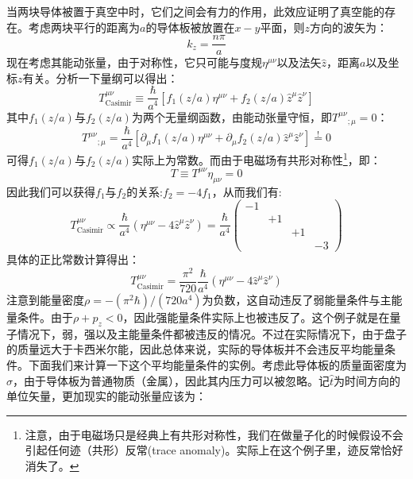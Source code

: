 \documentclass[hyperref, UTF8, a4paper]{ctexart}
\begin{document}
当两块导体被置于真空中时，它们之间会有力的作用，此效应证明了真空能的存在。考虑两块平行的距离为$a$的导体板被放置在$x-y$平面，则$z$方向的波矢为：
\begin{equation*}
	k_{z} =\frac{n\pi }{a}
\end{equation*}
现在考虑其能动张量，由于对称性，它只可能与度规$\eta ^{\mu \nu }$以及法矢$\hat{z}$，距离$a$以及坐标$z$有关。分析一下量纲可以得出：
\begin{equation*}
	T_{\text{Casimir}}^{\mu \nu } \equiv \frac{\hbar }{a^{4}}\left[ f_{1}( z/a) \eta ^{\mu \nu } +f_{2}( z/a)\hat{z}^{\mu }\hat{z}^{\nu }\right]
\end{equation*}
其中$f_{1}( z/a)$与$f_{2}( z/a)$为两个无量纲函数，由能动张量守恒，即$T^{\mu \nu }{}_{;\mu } =0$：
\begin{equation*}
	T^{\mu \nu }{}_{;\mu } =\frac{\hbar }{a^{4}}\left[ \partial _{\mu } f_{1}( z/a) \eta ^{\mu \nu } +\partial _{\mu } f_{2}( z/a)\hat{z}^{\mu }\hat{z}^{\nu }\right]\stackrel{!}{=} 0
\end{equation*}
可得$f_{1}( z/a)$与$f_{2}( z/a)$实际上为常数。而由于电磁场有共形对称性\footnote{注意，由于电磁场只是经典上有共形对称性，我们在做量子化的时候假设不会引起任何迹（共形）反常(trace anomaly)。实际上在这个例子里，迹反常恰好消失了。}，即：
\begin{equation*}
	T\equiv T^{\mu \nu } \eta _{\mu \nu } =0
\end{equation*}
因此我们可以获得$f_{1}$与$f_{2}$的关系:$f_{2} =-4f_{1}$，从而我们有:
\begin{equation*}
	T_{\text{Casimir}}^{\mu \nu } \varpropto \frac{\hbar }{a^{4}} (\eta ^{\mu \nu } -4\hat{z}^{\mu }\hat{z}^{\nu } )=\frac{\hbar }{a^{4}}\begin{pmatrix}
		-1 &  &  & \\
		& +1 &  & \\
		&  & +1 & \\
		&  &  & -3
	\end{pmatrix}
\end{equation*}
具体的正比常数计算得出：
\begin{equation*}
	T_{\text{Casimir}}^{\mu \nu } =\frac{\pi ^{2}}{720}\frac{\hbar }{a^{4}} (\eta ^{\mu \nu } -4\hat{z}^{\mu }\hat{z}^{\nu } )
\end{equation*}
注意到能量密度$\rho =-(\pi ^{2} \hbar )/(720a^{4} )$为负数，这自动违反了弱能量条件与主能量条件。由于$\rho +p_{z} < 0$，因此强能量条件实际上也被违反了。这个例子就是在量子情况下，弱，强以及主能量条件都被违反的情况。不过在实际情况下，由于盘子的质量远大于卡西米尔能，因此总体来说，实际的导体板并不会违反平均能量条件。下面我们来计算一下这个平均能量条件的实例。考虑此导体板的质量面密度为$\sigma $，由于导体板为普通物质（金属），因此其内压力可以被忽略。记$\hat{t}$为时间方向的单位矢量，更加现实的能动张量应该为：
\end{document}
